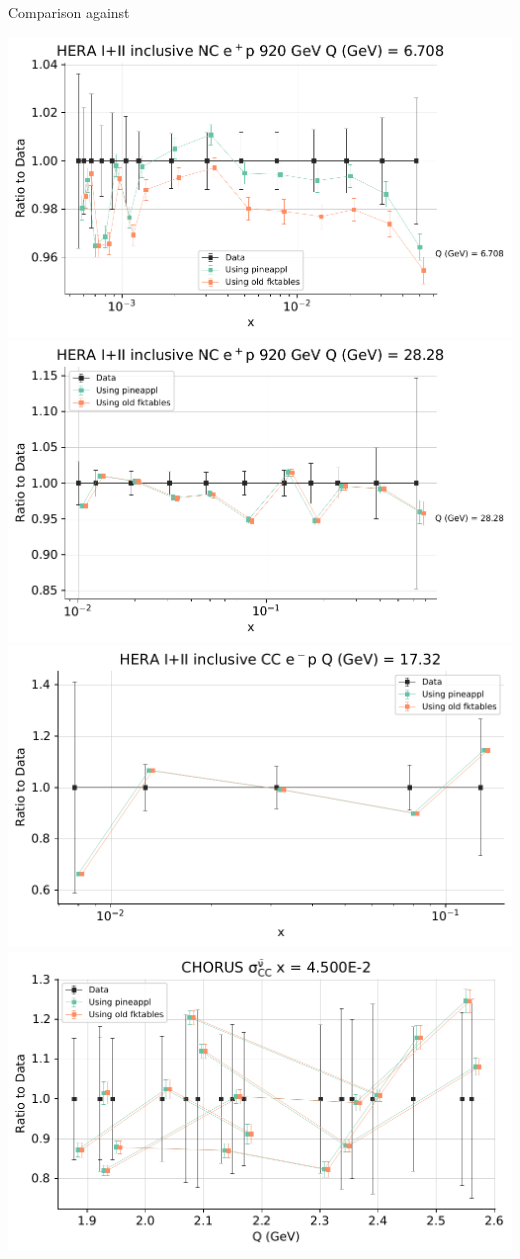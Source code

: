 \documentclass[9pt]{beamer}
\begin{document}
\begin{frame}{Comparison \yadism{} against \apfel{}}
    \begin{center}
        \includegraphics[width=.47\linewidth]{
            matched_datasets_from_dataspecs14_dataset_report_Datanorm_plot_fancy_dataspecs_11.pdf
        }
        \quad
        \includegraphics[width=.47\linewidth]{
            matched_datasets_from_dataspecs14_dataset_report_Datanorm_plot_fancy_dataspecs_23.pdf
        }
        \includegraphics[width=.47\linewidth]{
            matched_datasets_from_dataspecs4_dataset_report_Datanorm_plot_fancy_dataspecs_0.pdf
        }
        \quad
        \includegraphics[width=.47\linewidth]{
            matched_datasets_from_dataspecs2_dataset_report_Datanorm_plot_fancy_dataspecs_0.pdf
        }


    \end{center}
\end{frame}
\end{document}
